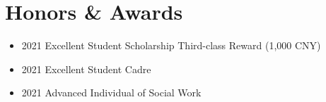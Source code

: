 \documentclass[letterpaper,11pt]{article}
\begin{document}

\section{Honors \& Awards}
    \vspace{2pt}
    \begin{itemize}[leftmargin=0.15in, label={}] 
    \item 2021 Excellent Student Scholarship Third-class Reward (1,000 CNY) \\
    \vspace{-4pt}
    \item 2021 Excellent Student Cadre \\
    \vspace{-4pt}
    \item 2021 Advanced Individual of Social Work
    \end{itemize}
    \vspace{-15pt}

\end{document}
